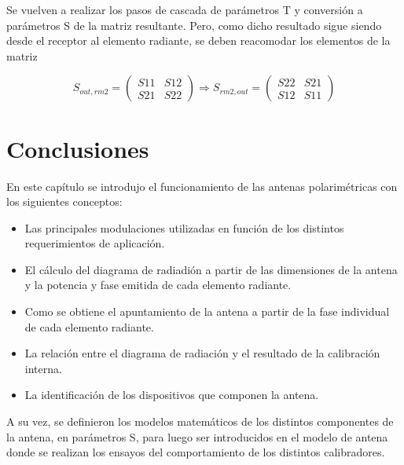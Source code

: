Se vuelven a realizar los pasos de cascada de parámetros T y conversión a parámetros S de la matriz resultante. Pero, como
dicho resultado sigue siendo desde el receptor al elemento radiante, se deben reacomodar los elementos de la matriz

$$
	S_{out,rm2} = \begin{pmatrix} S11&S12 \\ S21&S22\end{pmatrix} \Rightarrow
	S_{rm2, out} = \begin{pmatrix} S22&S21 \\ S12&S11 \end{pmatrix}
$$

\section{Conclusiones}

En este capítulo se introdujo el funcionamiento de las antenas polarimétricas con los siguientes conceptos:
\begin{itemize}
	\item Las principales modulaciones utilizadas en función de los distintos requerimientos de aplicación.
	\item El cálculo del diagrama de radiadión a partir de las dimensiones de la antena y la potencia y fase emitida de cada 
		elemento radiante.
	\item Como se obtiene el apuntamiento de la antena a partir de la fase individual de cada elemento radiante. 
	\item La relación entre el diagrama de radiación y el resultado de la calibración interna. 
	\item La identificación de los dispositivos que componen la antena.
\end{itemize}

A su vez, se definieron los modelos matemáticos de los distintos componentes de la antena, en parámetros S, para luego ser
introducidos en el modelo de antena donde se realizan los ensayos del comportamiento de los distintos calibradores. 


